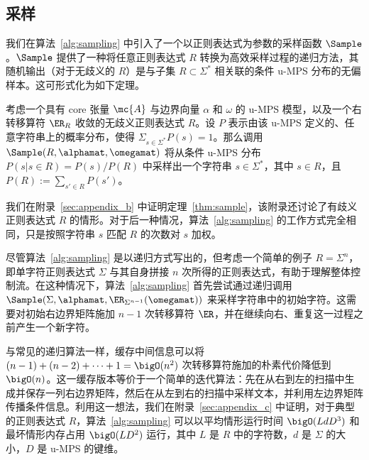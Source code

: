 \subsection{采样}

我们在算法~\ref{alg:sampling} 中引入了一个以正则表达式为参数的采样函数 $\Sample$。$\Sample$ 提供了一种将任意正则表达式 $R$ 转换为高效采样过程的递归方法，其随机输出（对于无歧义的 $R$）是与子集 $R \subset \Sigma^*$ 相关联的条件 u-MPS 分布的无偏样本。这可形式化为如下定理。
%
\begin{theorem}
\label{thm:sample}
考虑一个具有 core 张量 $\mc{A}$ 与边界向量 $\alpha$ 和 $\omega$ 的 u-MPS 模型，以及一个右转移算符 $\ER_R$ 收敛的无歧义正则表达式 $R$。设 $P$ 表示由该 u-MPS 定义的、任意字符串上的概率分布，使得 $\Sigma_{s\in\Sigma^*} P(s) = 1$。那么调用 $\Sample(R, \alphamat, \omegamat)$ 将从条件 u-MPS 分布 $P(s | s \in R) = P(s) / P(R)$ 中采样出一个字符串 $s \in \Sigma^*$，其中 $s \in R$，且 $P(R) := \sum_{s' \in R} P(s')$。
\end{theorem}
%
我们在附录~\ref{sec:appendix_b} 中证明定理~\ref{thm:sample}，该附录还讨论了有歧义正则表达式 $R$ 的情形。对于后一种情况，算法~\ref{alg:sampling} 的工作方式完全相同，只是按照字符串 $s$ 匹配 $R$ 的次数对 $s$ 加权。

尽管算法~\ref{alg:sampling} 是以递归方式写出的，但考虑一个简单的例子 $R = \Sigma^n$，即单字符正则表达式 $\Sigma$ 与其自身拼接 $n$ 次所得的正则表达式，有助于理解整体控制流。在这种情况下，算法~\ref{alg:sampling} 首先尝试通过递归调用 $\Sample(\Sigma, \alphamat, \ER_{\Sigma^{n-1}}(\omegamat))$ 来采样字符串中的初始字符。这需要对初始右边界矩阵施加 $n-1$ 次转移算符 $\ER$，并在继续向右、重复这一过程之前产生一个新字符。

与常见的递归算法一样，缓存中间信息可以将 $(n-1) + (n-2) + \cdots + 1 = \bigO(n^2)$ 次转移算符施加的朴素代价降低到 $\bigO(n)$。这一缓存版本等价于一个简单的迭代算法：先在从右到左的扫描中生成并保存一列右边界矩阵，然后在从左到右的扫描中采样文本，并利用左边界矩阵传播条件信息。利用这一想法，我们在附录~\ref{sec:appendix_c} 中证明，对于典型的正则表达式 $R$，算法~\ref{alg:sampling} 可以以平均情形运行时间 $\bigO(L d D^3)$ 和最坏情形内存占用 $\bigO(L D^2)$ 运行，其中 $L$ 是 $R$ 中的字符数，$d$ 是 $\Sigma$ 的大小，$D$ 是 u-MPS 的键维。

